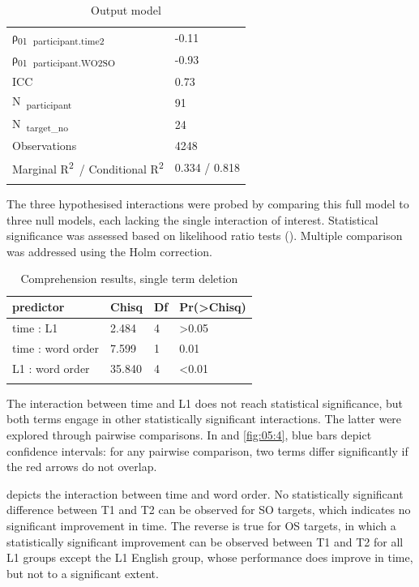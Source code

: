 \begin{table}
\begin{tabularx}{\textwidth}{XXXX}
    ρ\textsubscript{01}~\textsubscript{participant.time2} & \multicolumn{3}{X}{{}-0.11}\\
    ρ\textsubscript{01}~\textsubscript{participant.WO2SO} & \multicolumn{3}{X}{{}-0.93}\\
    ICC & \multicolumn{3}{X}{0.73}\\
    N~\textsubscript{participant} & \multicolumn{3}{X}{91}\\
    N~\textsubscript{target\_no} & \multicolumn{3}{X}{24}\\
    \midrule
    Observations & \multicolumn{3}{X}{4248}\\
    Marginal R\textsuperscript{2}~/ Conditional R\textsuperscript{2} & \multicolumn{3}{X}{0.334 / 0.818}\\
    \lspbottomrule
    \end{tabularx}
    \caption{Output model}
    \label{tab:05:3}
\end{table}

The three hypothesised interactions were probed by comparing this full model to three null models, each lacking the single interaction of interest. Statistical significance was assessed based on likelihood ratio tests (). Multiple comparison was addressed using the Holm correction.

\begin{table}
    \begin{tabularx}{\textwidth}{XXXX}
    \lsptoprule
    predictor & Chisq & Df & Pr(>Chisq)\\
    \midrule
    time : L1 & 2.484 & 4 & >0.05\\
    time : word order & 7.599 & 1 & 0.01\\
    L1 : word order & 35.840 & 4 & <0.01\\
    \lspbottomrule
    \end{tabularx}
    \caption{Comprehension results, single term deletion}
    \label{tab:05:4}
\end{table}

The interaction between time and L1 does not reach statistical significance, but both terms engage in other statistically significant interactions. The latter were explored through pairwise comparisons. In  and \ref{fig:05:4}, blue bars depict confidence intervals: for any pairwise comparison, two terms differ significantly if the red arrows do not overlap.

 depicts the interaction between time and word order. No statistically significant difference between T1 and T2 can be observed for SO targets, which indicates no significant improvement in time. The reverse is true for OS targets, in which a statistically significant improvement can be observed between T1 and T2 for all L1 groups except the L1 English group, whose performance does improve in time, but not to a significant extent.

